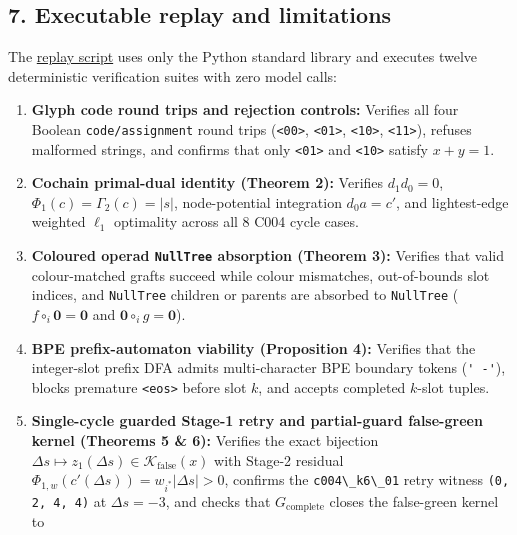 \documentclass[
  11pt,
]{article}
\newcommand{\passthrough}[1]{#1}
\providecommand{\tightlist}{%
  \setlength{\itemsep}{0pt}\setlength{\parskip}{0pt}}
\begin{document}
\subsection{7. Executable replay and
limitations}\label{executable-replay-and-limitations}

The \href{code/replay.py}{replay script} uses only the Python standard
library and executes twelve deterministic verification suites with zero
model calls:

\begin{enumerate}
\def\labelenumi{\arabic{enumi}.}
\tightlist
\item
  \textbf{Glyph code round trips and rejection controls:} Verifies all
  four Boolean \nolinkurl{code/assignment} round trips
  (\passthrough{\lstinline!<00>!}, \passthrough{\lstinline!<01>!},
  \passthrough{\lstinline!<10>!}, \passthrough{\lstinline!<11>!}),
  refuses malformed strings, and confirms that only
  \passthrough{\lstinline!<01>!} and \passthrough{\lstinline!<10>!}
  satisfy \(x+y=1\).
\item
  \textbf{Cochain primal-dual identity (Theorem 2):} Verifies
  \(d_1 d_0 = 0\), \(\Phi_1(c) = \Gamma_2(c) = |s|\), node-potential
  integration \(d_0 a = c'\), and lightest-edge weighted \(\ell_1\)
  optimality across all 8 C004 cycle cases.
\item
  \textbf{Coloured operad \passthrough{\lstinline!NullTree!} absorption
  (Theorem 3):} Verifies that valid colour-matched grafts succeed while
  colour mismatches, out-of-bounds slot indices, and
  \passthrough{\lstinline!NullTree!} children or parents are absorbed to
  \passthrough{\lstinline!NullTree!}
  (\(f \circ_i \mathbf{0} = \mathbf{0}\) and
  \(\mathbf{0} \circ_i g = \mathbf{0}\)).
\item
  \textbf{BPE prefix-automaton viability (Proposition 4):} Verifies that
  the integer-slot prefix DFA admits multi-character BPE boundary tokens
  (\passthrough{\lstinline!' -'!}), blocks premature
  \passthrough{\lstinline!<eos>!} before slot \(k\), and accepts
  completed \(k\)-slot tuples.
\item
  \textbf{Single-cycle guarded Stage-1 retry and partial-guard
  false-green kernel (Theorems 5 \& 6):} Verifies the exact bijection
  \(\Delta s \mapsto z_1(\Delta s) \in \mathcal{K}_{\text{false}}(x)\)
  with Stage-2 residual
  \(\Phi_{1,\allowbreak w}(c'(\Delta s)) = w_{i^*}|\Delta s| > 0\),
  confirms the \passthrough{\lstinline!c004\_k6\_01!} retry witness
  \passthrough{\lstinline!(0, 2, 4, 4)!} at \(\Delta s = -3\), and
  checks that \(G_{\text{complete}}\) closes the false-green kernel to

\end{enumerate}
\end{document}
